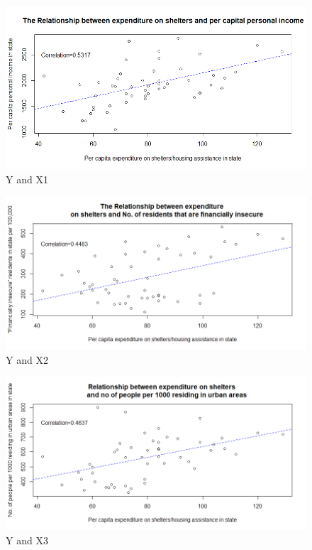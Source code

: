 \documentclass{article}
\begin{document}
\begin{figure} 
    \centering
    \includegraphics[width=1.3\textwidth]{Y and X1.png}
    \caption{Y and X1}
    \label{fig:enter-label}
\end{figure}

\begin{figure} 
    \centering
    \includegraphics[width=1.3\textwidth]{Y and X2.png}
    \caption{Y and X2}
    \label{fig:enter-label}
\end{figure}

\begin{figure} 
    \centering
    \includegraphics[width=1.3\textwidth]{Y and X3.png}
    \caption{Y and X3}
    \label{fig:enter-label}
\end{figure}
\end{document}
